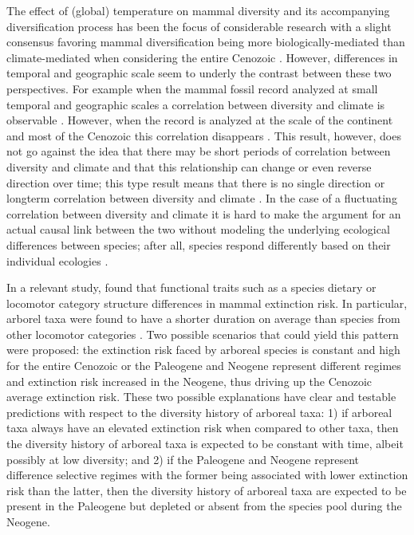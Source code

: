 \documentclass[12pt,letterpaper]{article}
\begin{document}
The effect of (global) temperature on mammal diversity and its accompanying diversification process has been the focus of considerable research with a slight consensus favoring mammal diversification being more biologically-mediated than climate-mediated when considering the entire Cenozoic \citep{Alroy2000g,Figueirido2012,Clyde1998a}. However, differences in temporal and geographic scale seem to underly the contrast between these two perspectives. For example when the mammal fossil record analyzed at small temporal and geographic scales a correlation between diversity and climate is observable \citep{Clyde1998a,Woodburne2009}. However, when the record is analyzed at the scale of the continent and most of the Cenozoic this correlation disappears \citep{Alroy2000g}. This result, however, does not go against the idea that there may be short periods of correlation between diversity and climate and that this relationship can change or even reverse direction over time; this type result means that there is no single direction or longterm correlation between diversity and climate \citep{Figueirido2012}. In the case of a fluctuating correlation between diversity and climate it is hard to make the argument for an actual causal link between the two without modeling the underlying ecological differences between species; after all, species respond differently based on their individual ecologies \citep{Blois2009}. 


In a relevant study, \citet{Smits2015b} found that functional traits such as a species dietary or locomotor category structure differences in mammal extinction risk. In particular, arborel taxa were found to have a shorter duration on average than species from other locomotor categories \citep{Smits2015b}. Two possible scenarios that could yield this pattern were proposed: the extinction risk faced by arboreal species is constant and high for the entire Cenozoic or the Paleogene and Neogene represent different regimes and extinction risk increased in the Neogene, thus driving up the Cenozoic average extinction risk. These two possible explanations have clear and testable predictions with respect to the diversity history of arboreal taxa: 1) if arboreal taxa always have an elevated extinction risk when compared to other taxa, then the diversity history of arboreal taxa is expected to be constant with time, albeit possibly at low diversity; and 2) if the Paleogene and Neogene represent difference selective regimes with the former being associated with lower extinction risk than the latter, then the diversity history of arboreal taxa are expected to be present in the Paleogene but depleted or absent from the species pool during the Neogene.
\end{document}
